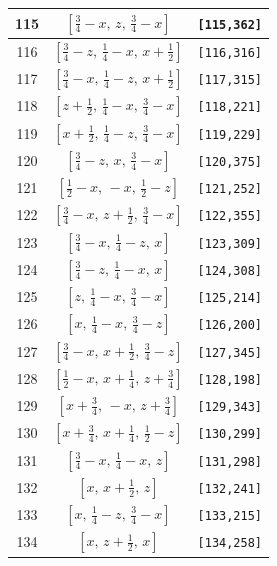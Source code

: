 \documentclass[fleqn,8pt]{jsarticle}
\begin{document}
\begin{longtable}{ccc}
115 & $\left[ \frac{3}{4} - x,\, z,\, \frac{3}{4} - x \right]$ & {\tt [115,362]} \\ \hline
116 & $\left[ \frac{3}{4} - z,\, \frac{1}{4} - x,\, x + \frac{1}{2} \right]$ & {\tt [116,316]} \\ \hline
117 & $\left[ \frac{3}{4} - x,\, \frac{1}{4} - z,\, x + \frac{1}{2} \right]$ & {\tt [117,315]} \\ \hline
118 & $\left[ z + \frac{1}{2},\, \frac{1}{4} - x,\, \frac{3}{4} - x \right]$ & {\tt [118,221]} \\ \hline
119 & $\left[ x + \frac{1}{2},\, \frac{1}{4} - z,\, \frac{3}{4} - x \right]$ & {\tt [119,229]} \\ \hline
120 & $\left[ \frac{3}{4} - z,\, x,\, \frac{3}{4} - x \right]$ & {\tt [120,375]} \\ \hline
121 & $\left[ \frac{1}{2} - x,\, - x,\, \frac{1}{2} - z \right]$ & {\tt [121,252]} \\ \hline
122 & $\left[ \frac{3}{4} - x,\, z + \frac{1}{2},\, \frac{3}{4} - x \right]$ & {\tt [122,355]} \\ \hline
123 & $\left[ \frac{3}{4} - x,\, \frac{1}{4} - z,\, x \right]$ & {\tt [123,309]} \\ \hline
124 & $\left[ \frac{3}{4} - z,\, \frac{1}{4} - x,\, x \right]$ & {\tt [124,308]} \\ \hline
125 & $\left[ z,\, \frac{1}{4} - x,\, \frac{3}{4} - x \right]$ & {\tt [125,214]} \\ \hline
126 & $\left[ x,\, \frac{1}{4} - x,\, \frac{3}{4} - z \right]$ & {\tt [126,200]} \\ \hline
127 & $\left[ \frac{3}{4} - x,\, x + \frac{1}{2},\, \frac{3}{4} - z \right]$ & {\tt [127,345]} \\ \hline
128 & $\left[ \frac{1}{2} - x,\, x + \frac{1}{4},\, z + \frac{3}{4} \right]$ & {\tt [128,198]} \\ \hline
129 & $\left[ x + \frac{3}{4},\, - x,\, z + \frac{3}{4} \right]$ & {\tt [129,343]} \\ \hline
130 & $\left[ x + \frac{3}{4},\, x + \frac{1}{4},\, \frac{1}{2} - z \right]$ & {\tt [130,299]} \\ \hline
131 & $\left[ \frac{3}{4} - x,\, \frac{1}{4} - x,\, z \right]$ & {\tt [131,298]} \\ \hline
132 & $\left[ x,\, x + \frac{1}{2},\, z \right]$ & {\tt [132,241]} \\ \hline
133 & $\left[ x,\, \frac{1}{4} - z,\, \frac{3}{4} - x \right]$ & {\tt [133,215]} \\ \hline
134 & $\left[ x,\, z + \frac{1}{2},\, x \right]$ & {\tt [134,258]} \\ \hline

\end{longtable}
\end{document}
